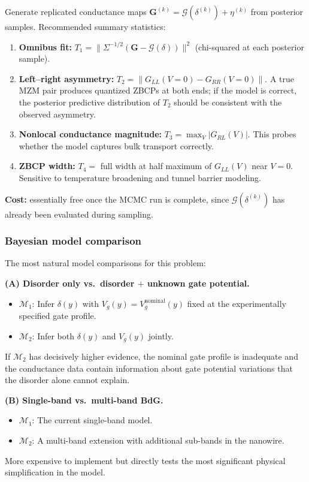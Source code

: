 \documentclass[11pt]{article}
\newcommand{\cG}{\mathcal{G}}
\newcommand{\cM}{\mathcal{M}}
\theoremstyle{plain}
\theoremstyle{remark}
\theoremstyle{definition}
\begin{document}
Generate replicated conductance maps 
$\mathbf{G}^{(k)} = \cG(\delta^{(k)}) + \eta^{(k)}$ from posterior 
samples. Recommended summary statistics:
\begin{enumerate}[label=(\roman*)]
\item \textbf{Omnibus fit:} 
  $T_1 = \|\Sigma^{-1/2}(\mathbf{G} - \cG(\delta))\|^2$ 
  (chi-squared at each posterior sample).
\item \textbf{Left--right asymmetry:} 
  $T_2 = \|G_{LL}(V=0) - G_{RR}(V=0)\|$. A true MZM pair produces 
  quantized ZBCPs at both ends; if the model is correct, the posterior 
  predictive distribution of $T_2$ should be consistent with the observed 
  asymmetry.
\item \textbf{Nonlocal conductance magnitude:} 
  $T_3 = \max_V |G_{RL}(V)|$. This probes whether the model captures 
  bulk transport correctly.
\item \textbf{ZBCP width:} 
  $T_4 = $ full width at half maximum of $G_{LL}(V)$ near $V = 0$. 
  Sensitive to temperature broadening and tunnel barrier modeling.
\end{enumerate}
\textbf{Cost:} essentially free once the MCMC run is complete, since 
$\cG(\delta^{(k)})$ has already been evaluated during sampling.

\subsubsection{Bayesian model comparison}

The most natural model comparisons for this problem:

\medskip
\noindent\textbf{(A) Disorder only vs.\ disorder $+$ unknown gate potential.}
\begin{itemize}
\item $\cM_1$: Infer $\delta(y)$ with $V_g(y) = V_g^{\text{nominal}}(y)$ 
  fixed at the experimentally specified gate profile.
\item $\cM_2$: Infer both $\delta(y)$ and $V_g(y)$ jointly.
\end{itemize}
If $\cM_2$ has decisively higher evidence, the nominal gate profile is 
inadequate and the conductance data contain information about gate 
potential variations that the disorder alone cannot explain.

\medskip
\noindent\textbf{(B) Single-band vs.\ multi-band BdG.}
\begin{itemize}
\item $\cM_1$: The current single-band model.
\item $\cM_2$: A multi-band extension with additional sub-bands in the 
  nanowire.
\end{itemize}
More expensive to implement but directly tests the most significant 
physical simplification in the model.
\end{document}
